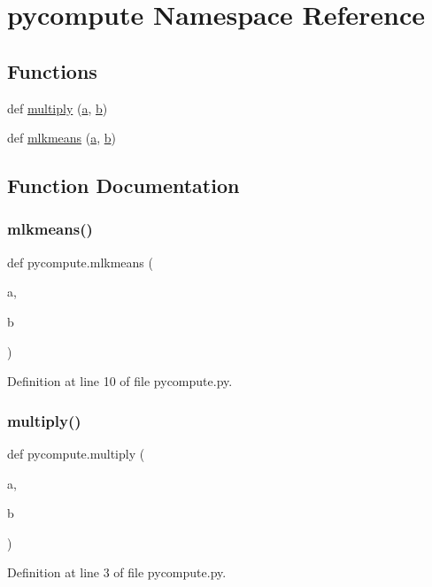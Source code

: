 \hypertarget{namespacepycompute}{}\section{pycompute Namespace Reference}
\label{namespacepycompute}
\subsection*{Functions}
\begin{DoxyCompactItemize}
\item 
def \mbox{\hyperlink{namespacepycompute_af7498e1653825e1a7a7a7d4a1e2701ac}{multiply}} (\mbox{\hyperlink{glad_8h_a3309789fc188587d666cda5ece79cf82}{a}}, \mbox{\hyperlink{glad_8h_a0f71581a41fd2264c8944126dabbd010}{b}})
\item 
def \mbox{\hyperlink{namespacepycompute_abdca62e5817db4d8fa567f074ec03b93}{mlkmeans}} (\mbox{\hyperlink{glad_8h_a3309789fc188587d666cda5ece79cf82}{a}}, \mbox{\hyperlink{glad_8h_a0f71581a41fd2264c8944126dabbd010}{b}})
\end{DoxyCompactItemize}


\subsection{Function Documentation}
\mbox{\label{namespacepycompute_abdca62e5817db4d8fa567f074ec03b93}} 
\subsubsection{\texorpdfstring{mlkmeans()}{mlkmeans()}}
{\footnotesize\ttfamily def pycompute.\+mlkmeans (\begin{DoxyParamCaption}\item[{}]{a,  }\item[{}]{b }\end{DoxyParamCaption})}



Definition at line 10 of file pycompute.\+py.

\mbox{\label{namespacepycompute_af7498e1653825e1a7a7a7d4a1e2701ac}} 
\subsubsection{\texorpdfstring{multiply()}{multiply()}}
{\footnotesize\ttfamily def pycompute.\+multiply (\begin{DoxyParamCaption}\item[{}]{a,  }\item[{}]{b }\end{DoxyParamCaption})}



Definition at line 3 of file pycompute.\+py.

